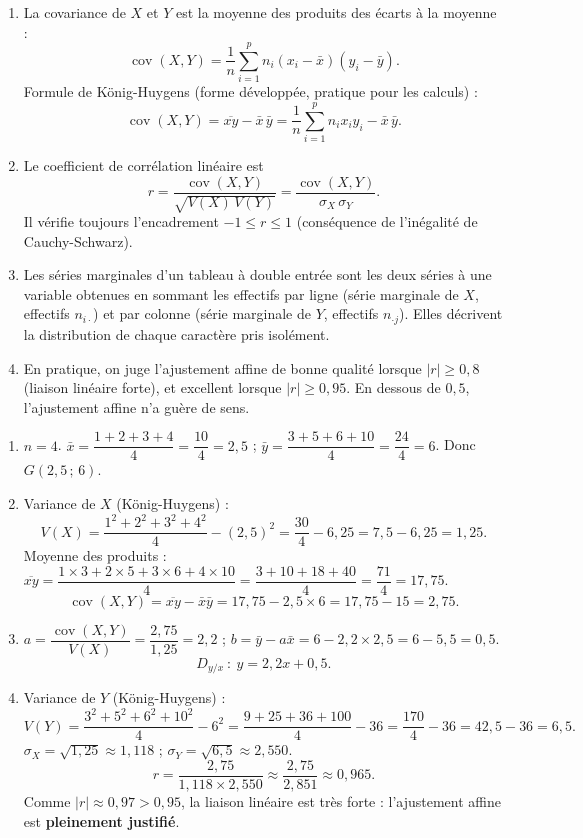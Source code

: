 \documentclass[11pt]{article}
\newcommand{\cle}[1]{{\popxbold\color{popdark}#1}}
\begin{document}
\begin{corrige}
\begin{enumerate}
\item La \cle{covariance} de $X$ et $Y$ est la moyenne des produits des écarts à la moyenne :
\[
\operatorname{cov}(X,Y)=\frac{1}{n}\sum_{i=1}^{p}n_i(x_i-\bar{x})(y_i-\bar{y}).
\]
Formule de König-Huygens (forme développée, pratique pour les calculs) :
\[
\operatorname{cov}(X,Y)=\overline{xy}-\bar{x}\,\bar{y}=\frac{1}{n}\sum_{i=1}^{p}n_i x_i y_i-\bar{x}\,\bar{y}.
\]
\item Le \cle{coefficient de corrélation linéaire} est
\[
r=\frac{\operatorname{cov}(X,Y)}{\sqrt{V(X)\,V(Y)}}=\frac{\operatorname{cov}(X,Y)}{\sigma_X\,\sigma_Y}.
\]
Il vérifie toujours l'encadrement $-1\le r\le 1$ (conséquence de l'inégalité de Cauchy-Schwarz).
\item Les \cle{séries marginales} d'un tableau à double entrée sont les deux séries à une variable obtenues en sommant les effectifs par ligne (série marginale de $X$, effectifs $n_{i\cdot}$) et par colonne (série marginale de $Y$, effectifs $n_{\cdot j}$). Elles décrivent la distribution de chaque caractère pris isolément.
\item En pratique, on juge l'ajustement affine de bonne qualité lorsque $|r|\ge 0{,}8$ (liaison linéaire forte), et excellent lorsque $|r|\ge 0{,}95$. En dessous de $0{,}5$, l'ajustement affine n'a guère de sens.
\end{enumerate}
\end{corrige}

\begin{corrige}
\begin{enumerate}
\item $n=4$. $\bar{x}=\dfrac{1+2+3+4}{4}=\dfrac{10}{4}=2{,}5$ ; $\bar{y}=\dfrac{3+5+6+10}{4}=\dfrac{24}{4}=6$. Donc $G(2{,}5\,;\,6)$.
\item Variance de $X$ (König-Huygens) :
\[
V(X)=\frac{1^2+2^2+3^2+4^2}{4}-(2{,}5)^2=\frac{30}{4}-6{,}25=7{,}5-6{,}25=1{,}25.
\]
Moyenne des produits : $\overline{xy}=\dfrac{1\times3+2\times5+3\times6+4\times10}{4}=\dfrac{3+10+18+40}{4}=\dfrac{71}{4}=17{,}75$.
\[
\operatorname{cov}(X,Y)=\overline{xy}-\bar{x}\bar{y}=17{,}75-2{,}5\times6=17{,}75-15=2{,}75.
\]
\item $a=\dfrac{\operatorname{cov}(X,Y)}{V(X)}=\dfrac{2{,}75}{1{,}25}=2{,}2$ ; $b=\bar{y}-a\bar{x}=6-2{,}2\times2{,}5=6-5{,}5=0{,}5$.
\[
D_{y/x}\ :\ y=2{,}2x+0{,}5.
\]
\item Variance de $Y$ (König-Huygens) :
\[
V(Y)=\frac{3^2+5^2+6^2+10^2}{4}-6^2=\frac{9+25+36+100}{4}-36=\frac{170}{4}-36=42{,}5-36=6{,}5.
\]
$\sigma_X=\sqrt{1{,}25}\approx1{,}118$ ; $\sigma_Y=\sqrt{6{,}5}\approx2{,}550$.
\[
r=\frac{2{,}75}{1{,}118\times2{,}550}\approx\frac{2{,}75}{2{,}851}\approx0{,}965.
\]
Comme $|r|\approx0{,}97>0{,}95$, la liaison linéaire est très forte : l'ajustement affine est \textbf{pleinement justifié}.
\end{enumerate}
\end{corrige}
\end{document}

